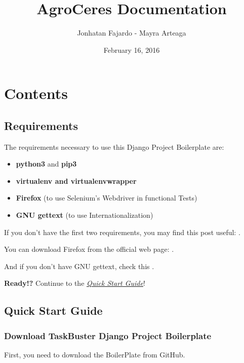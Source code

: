 \documentclass[letterpaper,10pt,english]{sphinxmanual}
\title{AgroCeres Documentation}
\date{February 16, 2016}
\author{Jonhatan Fajardo - Mayra Arteaga}
\begin{document}
\maketitle
\tableofcontents
{}\label{index::doc}



\chapter{Contents}
\label{index:welcome-to-agroceres-s-documentation}\label{index:contents}

\section{Requirements}
\label{requirements:requirements}\label{requirements::doc}
The requirements necessary to use this Django Project Boilerplate are:
\begin{itemize}
\item {} 
\textbf{python3} and \textbf{pip3}

\item {} 
\textbf{virtualenv and virtualenvwrapper}

\item {} 
\textbf{Firefox} (to use Selenium's Webdriver in functional Tests)

\item {} 
\textbf{GNU gettext} (to use Internationalization)

\end{itemize}

If you don't have the first two requirements, you may find this
post useful: .

You can download Firefox from the official web page: .

And if you don't have GNU gettext, check this .

\textbf{Ready!?} Continue to the {\hyperref[quick_start::doc]{\emph{\emph{Quick Start Guide}}}}!


\section{Quick Start Guide}
\label{quick_start:quick-start-guide}\label{quick_start::doc}

\subsection{Download TaskBuster Django Project Boilerplate}
\label{quick_start:download-taskbuster-django-project-boilerplate}
First, you need to download the BoilerPlate from GitHub.
\end{document}
